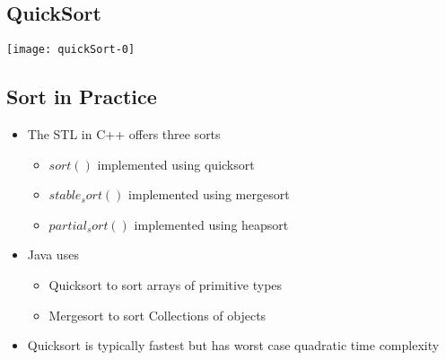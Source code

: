 
\begin{slide}
\section[-1]{QuickSort}
\pb
\pause

\begin{center}
  \texttt{[image: quickSort-0]}
  {}
\end{center}

\end{slide}



\begin{slide}
\section[-1]{Sort in Practice}

\begin{PauseHighLight}
  \begin{itemize}
  \item The STL in C++ offers three sorts
    \begin{itemize}
    \item \jl$sort()$ implemented using quicksort\pause
    \item \jl$stable_sort()$ implemented using mergesort\pause
    \item \jl$partial_sort()$ implemented using heapsort\pause
    \end{itemize}
  \item Java uses
    \begin{itemize}
    \item Quicksort to sort arrays of primitive types\pause
    \item Mergesort to sort Collections of objects\pause
    \end{itemize}
  \item Quicksort is typically fastest but has worst case quadratic time
    complexity\pause
  \end{itemize}
\end{PauseHighLight}

\end{slide}


